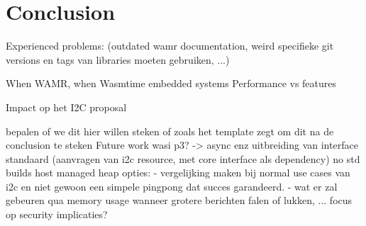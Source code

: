 \chapter*{Conclusion}






Experienced problems: (outdated wamr documentation, weird specifieke git versions en tags van libraries moeten gebruiken, ...)

When WAMR, when Wasmtime
embedded systems
Performance vs features

Impact op het I2C proposal

bepalen of we dit hier willen steken of zoals het template zegt om dit na de conclusion te steken
Future work
wasi p3? -> async enz
uitbreiding van interface standaard (aanvragen van i2c resource, met core interface als dependency)
no std builds
host managed heap opties:
 - vergelijking maken bij normal use cases van i2c en niet gewoon een simpele pingpong dat succes garandeerd.
 - wat er zal gebeuren qua memory usage wanneer grotere berichten falen of lukken, ...
focus op security implicaties?




















